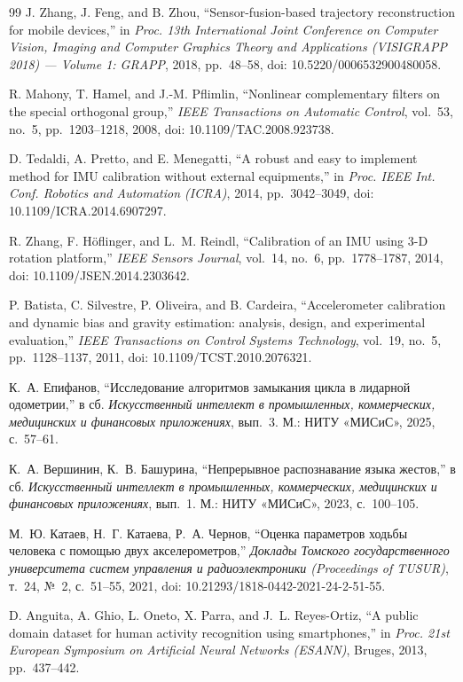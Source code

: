 \documentclass{misisarticle}
\begin{document}
\begin{thebibliography}{99}
 J. Zhang, J. Feng, and B. Zhou, ``Sensor-fusion-based trajectory reconstruction for mobile devices,'' in \textit{Proc. 13th International Joint Conference on Computer Vision, Imaging and Computer Graphics Theory and Applications (VISIGRAPP 2018) --- Volume 1: GRAPP}, 2018, pp.~48--58, doi: 10.5220/0006532900480058.

 R. Mahony, T. Hamel, and J.-M. Pflimlin, ``Nonlinear complementary filters on the special orthogonal group,'' \textit{IEEE Transactions on Automatic Control}, vol.~53, no.~5, pp.~1203--1218, 2008, doi: 10.1109/TAC.2008.923738.

 D. Tedaldi, A. Pretto, and E. Menegatti, ``A robust and easy to implement method for IMU calibration without external equipments,'' in \textit{Proc. IEEE Int. Conf. Robotics and Automation (ICRA)}, 2014, pp.~3042--3049, doi: 10.1109/ICRA.2014.6907297.

 R. Zhang, F. Höflinger, and L.~M. Reindl, ``Calibration of an IMU using 3-D rotation platform,'' \textit{IEEE Sensors Journal}, vol.~14, no.~6, pp.~1778--1787, 2014, doi: 10.1109/JSEN.2014.2303642.

 P. Batista, C. Silvestre, P. Oliveira, and B. Cardeira, ``Accelerometer calibration and dynamic bias and gravity estimation: analysis, design, and experimental evaluation,'' \textit{IEEE Transactions on Control Systems Technology}, vol.~19, no.~5, pp.~1128--1137, 2011, doi: 10.1109/TCST.2010.2076321.

 К.~А. Епифанов, ``Исследование алгоритмов замыкания цикла в лидарной одометрии,'' в сб. \textit{Искусственный интеллект в промышленных, коммерческих, медицинских и финансовых приложениях}, вып.~3. М.: НИТУ «МИСиС», 2025, с.~57--61.

 К.~А. Вершинин, К.~В. Башурина, ``Непрерывное распознавание языка жестов,'' в сб. \textit{Искусственный интеллект в промышленных, коммерческих, медицинских и финансовых приложениях}, вып.~1. М.: НИТУ «МИСиС», 2023, с.~100--105.

 М.~Ю. Катаев, Н.~Г. Катаева, Р.~А. Чернов, ``Оценка параметров ходьбы человека с помощью двух акселерометров,'' \textit{Доклады Томского государственного университета систем управления и радиоэлектроники (Proceedings of TUSUR)}, т.~24, №~2, с.~51--55, 2021, doi: 10.21293/1818-0442-2021-24-2-51-55.

 D. Anguita, A. Ghio, L. Oneto, X. Parra, and J.~L. Reyes-Ortiz, ``A public domain dataset for human activity recognition using smartphones,'' in \textit{Proc. 21st European Symposium on Artificial Neural Networks (ESANN)}, Bruges, 2013, pp.~437--442.

\end{thebibliography}
\end{document}
